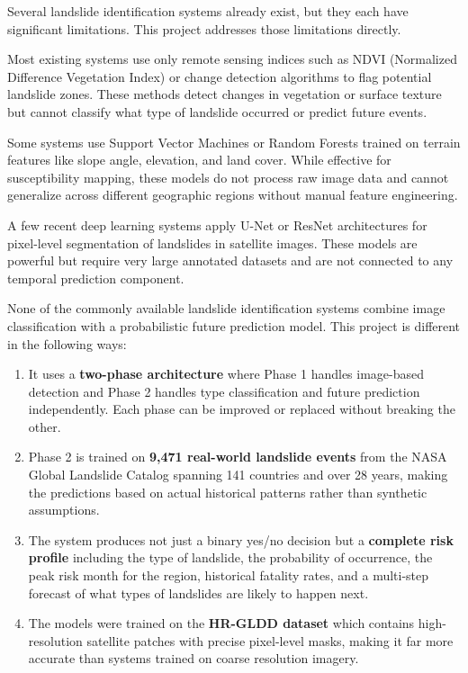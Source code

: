 \documentclass[11pt]{article}
\begin{document}
Several landslide identification systems already exist, but they each have significant limitations. This project addresses those limitations directly.

Most existing systems use only remote sensing indices such as NDVI (Normalized Difference Vegetation Index) or change detection algorithms to flag potential landslide zones. These methods detect changes in vegetation or surface texture but cannot classify what type of landslide occurred or predict future events.

Some systems use Support Vector Machines or Random Forests trained on terrain features like slope angle, elevation, and land cover. While effective for susceptibility mapping, these models do not process raw image data and cannot generalize across different geographic regions without manual feature engineering.

A few recent deep learning systems apply U-Net or ResNet architectures for pixel-level segmentation of landslides in satellite images. These models are powerful but require very large annotated datasets and are not connected to any temporal prediction component.

None of the commonly available landslide identification systems combine image classification with a probabilistic future prediction model. This project is different in the following ways:

\begin{enumerate}
    \item It uses a \textbf{two-phase architecture} where Phase 1 handles image-based detection and Phase 2 handles type classification and future prediction independently. Each phase can be improved or replaced without breaking the other.

    \item Phase 2 is trained on \textbf{9,471 real-world landslide events} from the NASA Global Landslide Catalog spanning 141 countries and over 28 years, making the predictions based on actual historical patterns rather than synthetic assumptions.

    \item The system produces not just a binary yes/no decision but a \textbf{complete risk profile} including the type of landslide, the probability of occurrence, the peak risk month for the region, historical fatality rates, and a multi-step forecast of what types of landslides are likely to happen next.

    \item The models were trained on the \textbf{HR-GLDD dataset} which contains high-resolution satellite patches with precise pixel-level masks, making it far more accurate than systems trained on coarse resolution imagery.
\end{enumerate}
\end{document}

